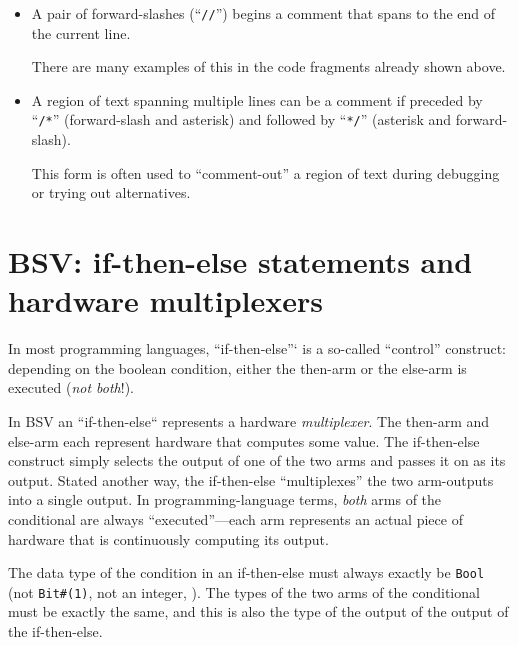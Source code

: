 \begin{itemize}

  \item A pair of forward-slashes (``\verb|//|'') begins a comment
    that spans to the end of the current line.

    There are many examples of this in the code fragments already
    shown above.

  \item A region of text spanning multiple lines can be a comment if
    preceded by ``\verb|/*|'' (forward-slash and asterisk) and followed by
    ``\verb|*/|'' (asterisk and forward-slash).

    This form is often used to ``comment-out'' a region of text during
    debugging or trying out alternatives.

\end{itemize}


\section{BSV: if-then-else statements and hardware multiplexers}

\label{BSV_if_then_else}


In most programming languages, ``if-then-else''` is a so-called
``control'' construct: depending on the boolean condition, either the
then-arm or the else-arm is executed (\emph{not both}!).

In BSV an ``if-then-else`` represents a hardware \emph{multiplexer}.
The then-arm and else-arm each represent hardware that computes some
value.  The if-then-else construct simply selects the output of one of
the two arms and passes it on as its output.  Stated another way, the
if-then-else ``multiplexes'' the two arm-outputs into a single output.
In programming-language terms, \emph{both} arms of the conditional are
always ``executed''---each arm represents an actual piece of hardware
that is continuously computing its output.

The data type of the condition in an if-then-else must always exactly
be \verb|Bool| (not \verb|Bit#(1)|, not an integer, {\etc}).  The
types of the two arms of the conditional must be exactly the same, and
this is also the type of the output of the output of the if-then-else.

